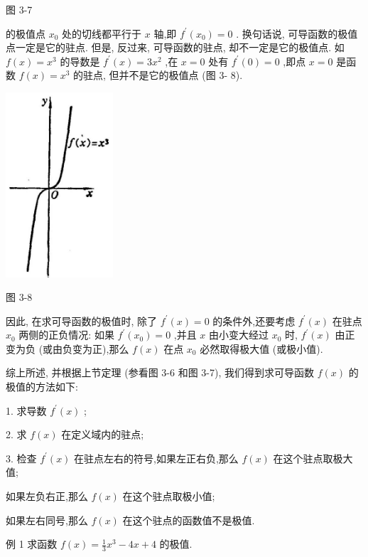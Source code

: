 \documentclass[lang=cn,newtx,10pt,scheme=chinese]{elegantbook}
\begin{document}
图 3-7

的极值点 \({x}_{0}\) 处的切线都平行于 \(x\) 轴,即 \({f}^{\prime }\left( {x}_{0}\right) = 0\) . 换句话说, 可导函数的极值点一定是它的驻点. 但是, 反过来, 可导函数的驻点, 却不一定是它的极值点. 如 \(f\left( x\right) = {x}^{3}\) 的导数是 \({f}^{\prime }\left( x\right) = 3{x}^{2}\) ,在 \(x = 0\) 处有 \({f}^{\prime }\left( 0\right) = 0\) ,即点 \(x = 0\) 是函数 \(f\left( x\right) = {x}^{3}\) 的驻点, 但并不是它的极值点 (图 3- 8).

\begin{center}
\includegraphics[max width=0.3\textwidth]{images/01912c18-5c3f-733d-b775-749ba9897a9d_141_203287.jpg}
\end{center}

图 3-8

因此, 在求可导函数的极值时, 除了 \({f}^{\prime }\left( x\right) = 0\) 的条件外,还要考虑 \({f}^{\prime }\left( x\right)\) 在驻点 \({x}_{0}\) 两侧的正负情况: 如果 \({f}^{\prime }\left( {x}_{0}\right) = 0\) ,并且 \(x\) 由小变大经过 \({x}_{0}\) 时, \({f}^{\prime }\left( x\right)\) 由正变为负 (或由负变为正),那么 \(f\left( x\right)\) 在点 \({x}_{0}\) 必然取得极大值 (或极小值).

综上所述, 并根据上节定理 (参看图 3-6 和图 3-7), 我们得到求可导函数 \(f\left( x\right)\) 的极值的方法如下:

1. 求导数 \({f}^{\prime }\left( x\right)\) ;

2. 求 \(f\left( x\right)\) 在定义域内的驻点;

3. 检查 \({f}^{\prime }\left( x\right)\) 在驻点左右的符号,如果左正右负,那么 \(f\left( x\right)\) 在这个驻点取极大值;

如果左负右正,那么 \(f\left( x\right)\) 在这个驻点取极小值;

如果左右同号,那么 \(f\left( x\right)\) 在这个驻点的函数值不是极值.

例 1 求函数 \(f\left( x\right) = \frac{1}{3}{x}^{3} - {4x} + 4\) 的极值.
\end{document}
